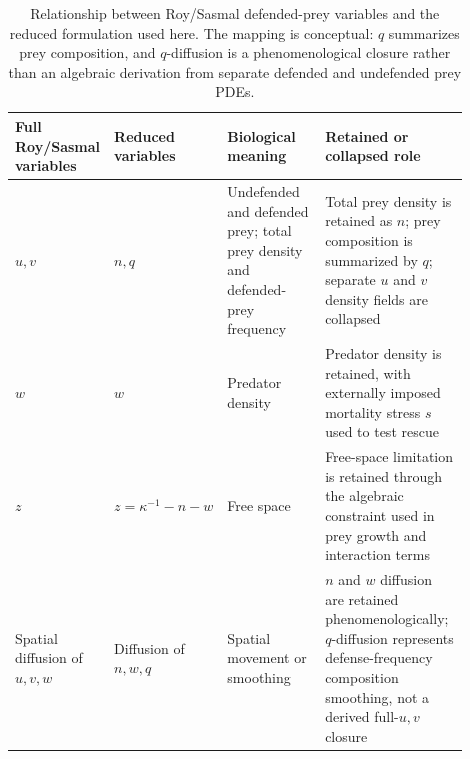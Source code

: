 \documentclass[11pt]{article}
\begin{document}
\begin{table}[htbp]
  \centering
  \caption{Relationship between Roy/Sasmal defended-prey variables and the reduced formulation used here. The mapping is conceptual: \(q\) summarizes prey composition, and \(q\)-diffusion is a phenomenological closure rather than an algebraic derivation from separate defended and undefended prey PDEs.}
  \label{tab:roy-style-mapping}
  \footnotesize
  \setlength{\tabcolsep}{3pt}
  \begin{tabular}{p{0.15\linewidth}p{0.15\linewidth}p{0.26\linewidth}p{0.34\linewidth}}
    \toprule
    Full Roy/Sasmal variables & Reduced variables & Biological meaning & Retained or collapsed role \\
    \midrule
    \(u,v\) & \(n,q\) & Undefended and defended prey; total prey density and defended-prey frequency & Total prey density is retained as \(n\); prey composition is summarized by \(q\); separate \(u\) and \(v\) density fields are collapsed \\
    \(w\) & \(w\) & Predator density & Predator density is retained, with externally imposed mortality stress \(s\) used to test rescue \\
    \(z\) & \(z=\kappa^{-1}-n-w\) & Free space & Free-space limitation is retained through the algebraic constraint used in prey growth and interaction terms \\
    Spatial diffusion of \(u,v,w\) & Diffusion of \(n,w,q\) & Spatial movement or smoothing & \(n\) and \(w\) diffusion are retained phenomenologically; \(q\)-diffusion represents defense-frequency composition smoothing, not a derived full-\(u,v\) closure \\
    \bottomrule
  \end{tabular}
\end{table}
\FloatBarrier
\end{document}
